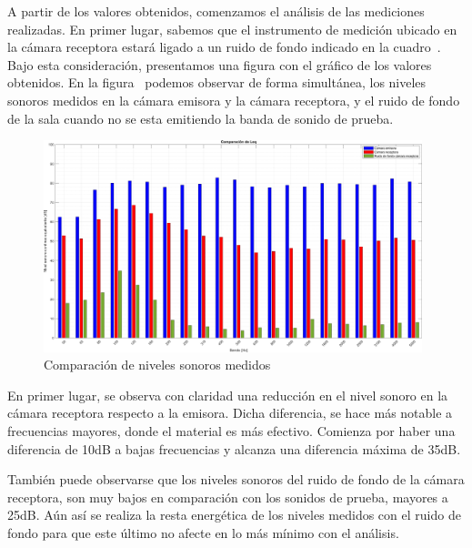\par A partir de los valores obtenidos, comenzamos el análisis de las mediciones realizadas. En primer lugar, sabemos que el instrumento de medición ubicado en la cámara receptora estará ligado a un ruido de fondo indicado en la cuadro~. Bajo esta consideración, presentamos una figura con el gráfico de los valores obtenidos. En la figura~ podemos observar de forma simultánea, los niveles sonoros medidos en la cámara emisora y la cámara receptora, y el ruido de fondo de la sala cuando no se esta emitiendo la banda de sonido de prueba.


\begin{figure}[H]
	\centering
	\includegraphics[width=0.98\textwidth]{./img/Comparacion_Leq_bars.png}
	\caption{Comparación de niveles sonoros medidos}
	\label{fig::comparacion_niveles_sonoros}
\end{figure}


\par En primer lugar, se observa con claridad una reducción en el nivel sonoro en la cámara receptora respecto a la emisora. Dicha diferencia, se hace más notable a frecuencias mayores, donde el material es más efectivo. Comienza por haber una diferencia de 10dB a bajas frecuencias y alcanza una diferencia máxima de 35dB. 


\par También puede observarse que los niveles sonoros del ruido de fondo de la cámara receptora, son muy bajos en comparación con los sonidos de prueba, mayores  a 25dB. Aún así se realiza la resta energética de los niveles medidos con el ruido de fondo para que este último no afecte en lo más mínimo con el análisis.\\

